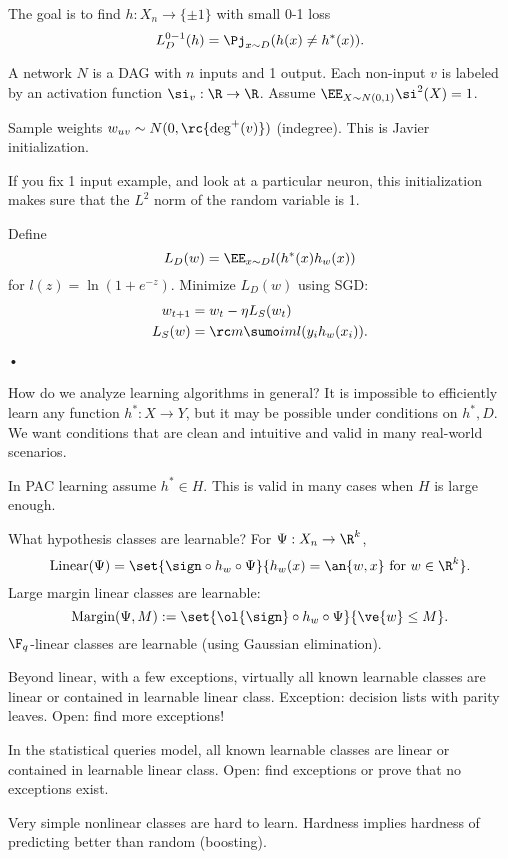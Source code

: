 The goal is to find $h:X_n\to \{\pm 1\}$ with small 0-1 loss
$$
L_D^{0-1}(h) = \Pj_{x\sim D}(h(x)\ne h^*(x)).
$$

A network $N$ is a DAG with $n$ inputs and 1 output. Each non-input $v$ is labeled by an activation function $\si_v:\R\to \R$. Assume $\EE_{X\sim N(0,1)} \si^2(X)=1$.

Sample weights $w_{uv}\sim N(0,\rc{\deg^+(v)})$ (indegree). This is Javier initialization.

If you fix 1 input example, and look at a particular neuron, this initialization makes sure that the $L^2$ norm of the random variable is 1.

Define
$$
L_D(w) = \EE_{x\sim D}l(h^*(x)h_w(x))
$$
for $l(z) = \ln (1+e^{-z})$. 
 Minimize $L_D(w)$ using SGD:
 \begin{align}
w_{t+1}&=w_t-\eta L_S(w_t)\\
L_S(w) &= \rc m\sumo im l(y_ih_w(x_i)).
\end{align}•
 
How do we analyze learning algorithms in general? %
It is impossible to efficiently learn any function $h^*:X\to Y$, but it may be possible under conditions on $h^*, D$. We want conditions that are clean and intuitive and valid in many real-world scenarios.

In PAC learning assume $h^*\in H$. This is valid in many cases when $H$ is large enough.

What hypothesis classes are learnable?
For $\Psi:X_n\to \R^k$, 
$$
\text{Linear}(\Psi) = \set{\sign\circ h_w\circ \Psi}{h_w(x)=\an{w,x}\text{ for }w\in \R^k}.
$$
Large margin linear classes are learnable:
$$
\text{Margin}(\Psi,M):= \set{\ol{\sign} \circ h_w\circ \Psi}{\ve{w}\le M}.
$$
$\F_q$-linear classes are learnable (using Gaussian elimination).

Beyond linear, with a few exceptions, virtually all known learnable classes are linear or contained in learnable linear class. Exception: decision lists with parity leaves. Open: find more exceptions!
 
In the statistical queries model, all known learnable classes are linear or contained in learnable linear class. Open: find exceptions or prove that no exceptions exist.
 
 Very simple nonlinear classes are hard to learn.
 Hardness implies hardness of predicting better than random (boosting).
 
